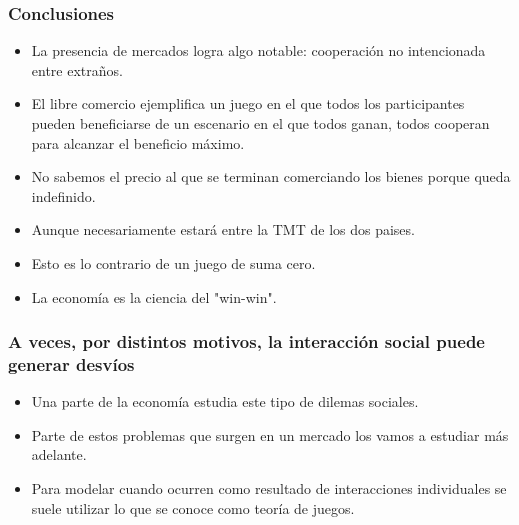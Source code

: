 \documentclass{beamer}
\begin{document}
\begin{frame}
    \frametitle{Conclusiones}
    \begin{itemize}
        \item La presencia de mercados logra algo notable: cooperación no intencionada entre extraños.
        \item El libre comercio ejemplifica un juego en el que todos los participantes pueden beneficiarse de un escenario en el que todos ganan, todos cooperan para alcanzar el beneficio máximo.
        \item No sabemos el precio al que se terminan comerciando los bienes porque queda indefinido.
        \item Aunque necesariamente estará entre la TMT de los dos paises.
        \item Esto es lo contrario de un juego de suma cero.
        \item La economía es la ciencia del "win-win".
    \end{itemize}
\end{frame}

\begin{frame}
    \frametitle{A veces, por distintos motivos, la interacción social puede generar desvíos}
    \begin{itemize}
        \item Una parte de la economía estudia este tipo de dilemas sociales.
        \item Parte de estos problemas que surgen en un mercado los vamos a estudiar más adelante.
        \item Para modelar cuando ocurren como resultado de interacciones individuales se suele utilizar lo que se conoce como teoría de juegos.
    \end{itemize}
\end{frame}
\end{document}

